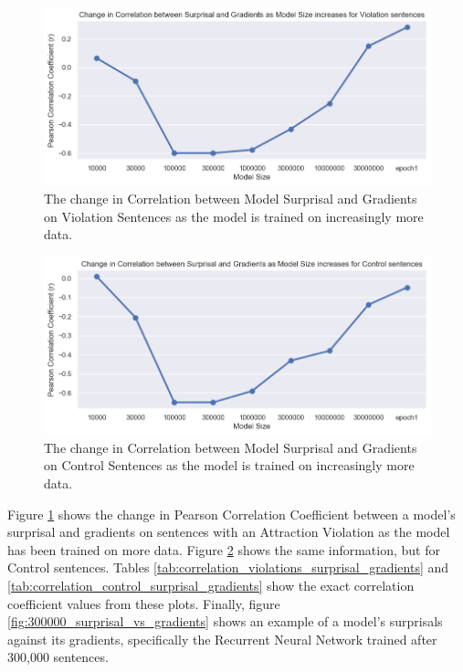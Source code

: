 \documentclass{IEEEtran}
\begin{document}
\begin{figure}
    \centering
    \includegraphics[width=.9\textwidth]{correlation_change/violations_surprisal_vs_gradients.png}
    \caption{The change in Correlation between Model Surprisal and Gradients on Violation Sentences as the model is trained on increasingly more data.}
    \label{fig:correlation_violations_surprisal_gradients}
\end{figure}
\begin{figure}
    \centering
    \includegraphics[width=.9\textwidth]{correlation_change/control_surprisal_vs_gradients.png}
    \caption{The change in Correlation between Model Surprisal and Gradients on Control Sentences as the model is trained on increasingly more data.}
    \label{fig:correlation_control_surprisal_gradients}
\end{figure}

Figure \ref{fig:correlation_violations_surprisal_gradients} shows the change in Pearson Correlation Coefficient between a model's surprisal and gradients on sentences with an Attraction Violation as the model has been trained on more data.
Figure \ref{fig:correlation_control_surprisal_gradients} shows the same information, but for Control sentences.
Tables \ref{tab:correlation_violations_surprisal_gradients} and \ref{tab:correlation_control_surprisal_gradients} show the exact correlation coefficient values from these plots.
Finally, figure \ref{fig:300000_surprisal_vs_gradients} shows an example of a model's surprisals against its gradients, specifically the Recurrent Neural Network trained after 300,000 sentences.
\end{document}
